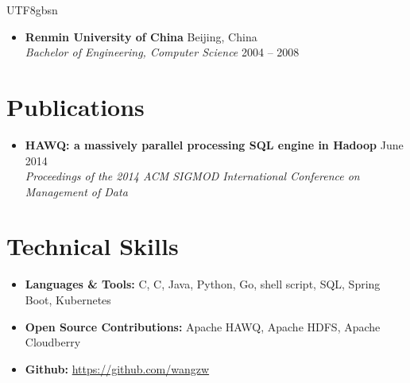\documentclass[10pt,a4paper]{article}
\newcommand{\entry}[4]{%
	\textbf{#1} \hfill {\color{subtle}#2}\\
	{\textit{#3}} \hfill {\color{subtle}\small #4}
}
\newcommand{\CPP}{C\nolinebreak[4]\hspace{-.05em}\raisebox{.22ex}{\footnotesize\bf ++}}
\begin{document}
\begin{CJK}{UTF8}{gbsn}
\begin{itemize}
	\item
	\entry{Renmin University of China}{Beijing, China}
		{Bachelor of Engineering, Computer Science}{2004 -- 2008}
\end{itemize}

\section*{Publications}

\begin{itemize}
	\item
	\textbf{HAWQ: a massively parallel processing SQL engine in Hadoop} \hfill {\color{subtle}June 2014}\\
	\textit{Proceedings of the 2014 ACM SIGMOD International Conference on Management of Data}
\end{itemize}

\section*{Technical Skills}

\begin{itemize}[label={}, leftmargin=0pt, itemsep=0pt]
	\item \textbf{Languages \& Tools:} C, \CPP, Java, Python, Go, shell script, SQL, Spring Boot, Kubernetes
	\item \textbf{Open Source Contributions:} Apache HAWQ, Apache HDFS, Apache Cloudberry
	\item \textbf{Github:} \href{https://github.com/wangzw}{https://github.com/wangzw}
\end{itemize}

\end{CJK}
\end{document}
